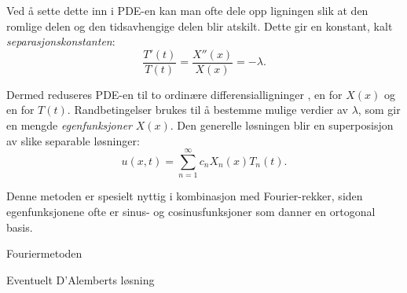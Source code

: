     Ved å sette dette inn i PDE-en kan man ofte dele opp ligningen slik at den romlige delen og den tidsavhengige delen blir atskilt. Dette gir en konstant, kalt \emph{separasjonskonstanten}:
    \[
    \frac{T'(t)}{T(t)} = \frac{X''(x)}{X(x)} = -\lambda.
    \]

    Dermed reduseres PDE-en til to ordinære differensialligninger , en for $X(x)$ og en for $T(t)$. Randbetingelser brukes til å bestemme mulige verdier av $\lambda$, som gir en mengde \emph{egenfunksjoner} $X(x)$. Den generelle løsningen blir en superposisjon av slike separable løsninger:
    \[
    u(x,t) = \sum_{n=1}^\infty c_n X_n(x) T_n(t).
    \]

    Denne metoden er spesielt nyttig i kombinasjon med Fourier-rekker, siden egenfunksjonene ofte er sinus- og cosinusfunksjoner som danner en ortogonal basis.


    Fouriermetoden

    Eventuelt D’Alemberts løsning
